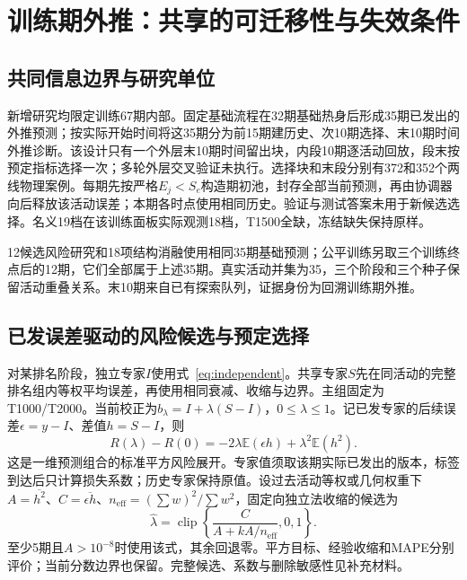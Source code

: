 \section{训练期外推：共享的可迁移性与失效条件}\label{sec:round2}
\subsection{共同信息边界与研究单位}
新增研究均限定训练67期内部。固定基础流程在32期基础热身后形成35期已发出的外推预测；按实际开始时间将这35期分为前15期建历史、次10期选择、末10期时间外推诊断。该设计只有一个外层末10期时间留出块，内段10期逐活动回放，段末按预定指标选择一次；多轮外层交叉验证未执行。选择块和末段分别有372和352个两线物理案例。每期先按严格\(E_j<S_e\)构造期初池，封存全部当前预测，再由协调器向后释放该活动误差；本期各时点使用相同历史。验证与测试答案未用于新候选选择。名义19档在该训练面板实际观测18档，T1500全缺，冻结缺失保持原样。

12候选风险研究和18项结构消融使用相同35期基础预测；公平训练另取三个训练终点后的12期，它们全部属于上述35期。真实活动并集为35，三个阶段和三个种子保留活动重叠关系。末10期来自已有探索队列，证据身份为回溯训练期外推。

\subsection{已发误差驱动的风险候选与预定选择}
对某排名阶段，独立专家\(I\)使用式~\eqref{eq:independent}。共享专家\(S\)先在同活动的完整排名组内等权平均误差，再使用相同衰减、收缩与边界。主组固定为T1000/T2000。当前校正为\(b_\lambda=I+\lambda(S-I)\)，\(0\le\lambda\le1\)。记已发专家的后续误差\(\epsilon=y-I\)、差值\(h=S-I\)，则
\begin{equation}\label{eq:issuedrisk}
R(\lambda)-R(0)=-2\lambda\mathbb E(\epsilon h)+\lambda^2\mathbb E(h^2).
\end{equation}
这是一维预测组合的标准平方风险展开\citep{bates1969combination,feldman2014averaging}。专家值须取该期实际已发出的版本，标签到达后只计算损失系数；历史专家保持原值。设过去活动等权或几何权重下\(A=\overline{h^2}\)、\(C=\overline{\epsilon h}\)、\(n_{\mathrm{eff}}=(\sum w)^2/\sum w^2\)，固定向独立法收缩的候选为
\begin{equation}\label{eq:lambda}
\widehat\lambda=\operatorname{clip}\!\left\{\frac{C}{A+kA/n_{\mathrm{eff}}},0,1\right\}.
\end{equation}
至少5期且\(A>10^{-8}\)时使用该式，其余回退零。平方目标、经验收缩和MAPE分别评价；当前分数边界也保留。完整候选、系数与删除敏感性见补充材料。

